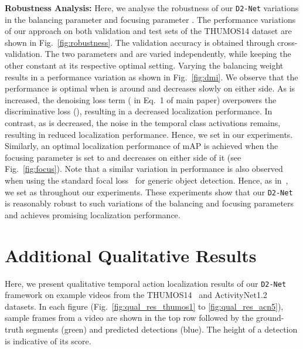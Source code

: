 \documentclass[10pt,twocolumn,letterpaper]{article}
\def\proposed{\texttt{D2-Net}{}}
\begin{document}
\noindent\textbf{Robustness Analysis:}
Here, we analyse the robustness of our \proposed{} \wrt variations in the balancing parameter  and focusing parameter . The performance variations of our approach on both validation and test sets of the THUMOS14 dataset are shown in Fig.~\ref{fig:robustness}. The validation accuracy is obtained through cross-validation. The two parameters  and  are varied independently, while keeping the other constant at its respective optimal setting. Varying the balancing weight  results in a performance variation as shown in Fig.~\ref{fig:dmi}. We observe that the performance is optimal when  is around  and decreases slowly on either side. As  is increased, the denoising loss term ( in Eq.~1 of main paper) overpowers the discriminative loss (), resulting in a decreased localization performance. In contrast, as  is decreased, the noise in the temporal class activations remains, resulting in reduced localization performance. Hence, we set  in our experiments. 
Similarly, an optimal localization performance of  mAP is achieved when the focusing parameter  is set to  and decreases on either side of it (see Fig.~\ref{fig:focus}). Note that a similar variation in performance is also observed when using the standard focal loss~\cite{focal_loss} for generic object detection. Hence, as in~\cite{focal_loss}, we set  as  throughout our experiments. These experiments show that our \proposed{} is reasonably robust to such variations of the balancing and focusing parameters and achieves promising localization performance.







\section{Additional Qualitative Results\label{sec:qual_res}}
Here, we present qualitative temporal action localization results of our \proposed{} framework on example videos from the THUMOS14~\cite{thumos14} and ActivityNet1.2~\cite{activitynet} datasets. In each figure (Fig.~\ref{fig:qual_res_thumos1} to \ref{fig:qual_res_acn5}), sample frames from a video are shown in the top row followed by the ground-truth segments (green) and predicted detections (blue). The height of a detection is indicative of its score. 
\end{document}
